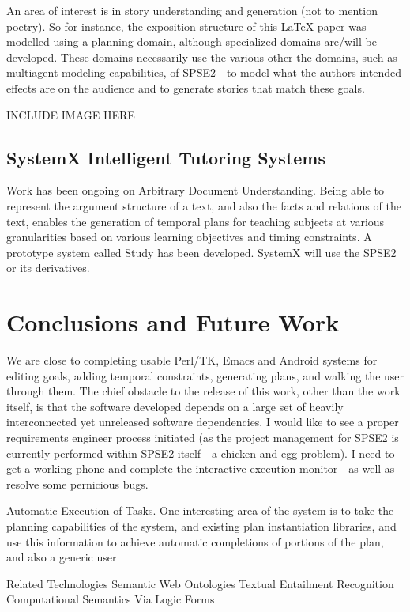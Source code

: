 \documentclass[letterpaper]{article}
\begin{document}
An area of interest is in story understanding and generation (not to
mention poetry).  So for instance, the exposition structure of this
LaTeX paper was modelled using a planning domain, although specialized
domains are/will be developed.  These domains necessarily use the
various other the domains, such as multiagent modeling capabilities,
of SPSE2 - to model what the authors intended effects are on the
audience and to generate stories that match these goals.

INCLUDE IMAGE HERE

\subsection{SystemX Intelligent Tutoring Systems}

Work has been ongoing on Arbitrary Document Understanding.  Being able
to represent the argument structure of a text, and also the facts and
relations of the text, enables the generation of temporal plans for
teaching subjects at various granularities based on various learning
objectives and timing constraints.  A prototype system called Study
has been developed.  SystemX will use the SPSE2 or its derivatives.

\section{Conclusions and Future Work}

\noindent We are close to completing usable Perl/TK, Emacs and Android
systems for editing goals, adding temporal constraints, generating
plans, and walking the user through them.  The chief obstacle to the
release of this work, other than the work itself, is that the software
developed depends on a large set of heavily interconnected yet
unreleased software dependencies.  I would like to see a proper
requirements engineer process initiated (as the project management for
SPSE2 is currently performed within SPSE2 itself - a chicken and egg
problem).  I need to get a working phone and complete the interactive
execution monitor - as well as resolve some pernicious bugs.

Automatic Execution of Tasks.  One interesting area of the system is
to take the planning capabilities of the system, and existing plan
instantiation libraries, and use this information to achieve automatic
completions of portions of the plan, and also a generic user

Related Technologies
Semantic Web Ontologies
Textual Entailment Recognition
Computational Semantics Via Logic Forms
\end{document}
